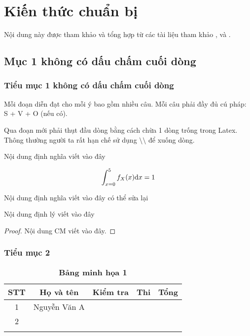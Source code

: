 \chapter{Kiến thức chuẩn bị}
\setcounter{page}{1}
Nội dung này được tham khảo và tổng hợp từ các tài liệu tham khảo \cite{1}, \cite{2} và \cite{5}. 


\section{Mục 1 không có dấu chấm cuối dòng}
\subsection{Tiểu mục 1 không có dấu chấm cuối dòng}

Mỗi đoạn diễn đạt cho mỗi ý bao gồm nhiều câu. Mỗi câu phải đầy đủ cú pháp: S + V + O (nếu có).

Qua đoạn mới phải thụt đầu dòng bằng cách chừa 1 dòng trống trong Latex. Thông thường người ta rất hạn chế sử dụng $\setminus\setminus$ để xuống dòng. 
\begin{definition}
 Nội dung định nghĩa viết vào đây
\end{definition}

\[ \int_{x=0}^5 f_X (x) {\rm d}x=1 \]

\begin{definition}
 Nội dung định nghĩa viết vào đây có thể sửa lại
\end{definition}

\begin{theorem}
 Nội dung định lý viết vào đây   
\end{theorem}

\begin{proof}
Nội dung CM viết vào đây.
\end{proof}

\subsection{Tiểu mục 2}

\begin{table}[ht]
 \caption{\textbf{Bảng minh họa 1}}
    \centering
    \begin{tabular}{|c|c|c|c|c|}
    \hline
     STT    & Họ và tên & Kiểm tra & Thi & Tổng\\
      \hline
     1    & Nguyễn Văn A &  &  & \\
      \hline
      2   &  &  &  & \\
       \hline
         &  &  &  & \\
       \hline
    \end{tabular} 
\end{table}

